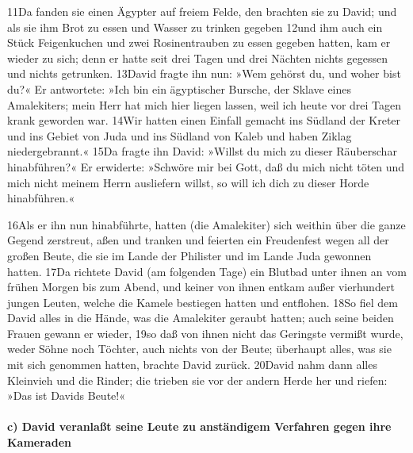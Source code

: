 11Da fanden sie einen Ägypter auf freiem Felde, den brachten sie zu
David; und als sie ihm Brot zu essen und Wasser zu trinken gegeben 12und
ihm auch ein Stück Feigenkuchen und zwei Rosinentrauben zu essen gegeben
hatten, kam er wieder zu sich; denn er hatte seit drei Tagen und drei
Nächten nichts gegessen und nichts getrunken. 13David fragte ihn nun:
»Wem gehörst du, und woher bist du?« Er antwortete: »Ich bin ein
ägyptischer Bursche, der Sklave eines Amalekiters; mein Herr hat mich
hier liegen lassen, weil ich heute vor drei Tagen krank geworden war.
14Wir hatten einen Einfall gemacht ins Südland der Kreter und ins Gebiet
von Juda und ins Südland von Kaleb und haben Ziklag niedergebrannt.«
15Da fragte ihn David: »Willst du mich zu dieser Räuberschar
hinabführen?« Er erwiderte: »Schwöre mir bei Gott, daß du mich nicht
töten und mich nicht meinem Herrn ausliefern willst, so will ich dich zu
dieser Horde hinabführen.«

16Als er ihn nun hinabführte, hatten (die Amalekiter) sich weithin über
die ganze Gegend zerstreut, aßen und tranken und feierten ein
Freudenfest wegen all der großen Beute, die sie im Lande der Philister
und im Lande Juda gewonnen hatten. 17Da richtete David (am folgenden
Tage) ein Blutbad unter ihnen an vom frühen Morgen bis zum Abend, und
keiner von ihnen entkam außer vierhundert jungen Leuten, welche die
Kamele bestiegen hatten und entflohen. 18So fiel dem David alles in die
Hände, was die Amalekiter geraubt hatten; auch seine beiden Frauen
gewann er wieder, 19so daß von ihnen nicht das Geringste vermißt wurde,
weder Söhne noch Töchter, auch nichts von der Beute; überhaupt alles,
was sie mit sich genommen hatten, brachte David zurück. 20David nahm
dann alles Kleinvieh und die Rinder; die trieben sie vor der andern
Herde her und riefen: »Das ist Davids Beute!«

\hypertarget{c-david-veranlauxdft-seine-leute-zu-anstuxe4ndigem-verfahren-gegen-ihre-kameraden}{%
\paragraph{c) David veranlaßt seine Leute zu anständigem Verfahren gegen
ihre
Kameraden}\label{c-david-veranlauxdft-seine-leute-zu-anstuxe4ndigem-verfahren-gegen-ihre-kameraden}}

